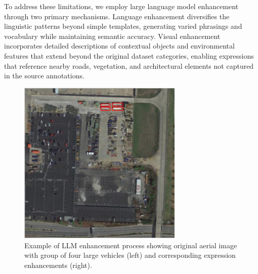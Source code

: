 To address these limitations, we employ large language model enhancement through two primary mechanisms. Language enhancement diversifies the linguistic patterns beyond simple templates, generating varied phrasings and vocabulary while maintaining semantic accuracy. Visual enhancement incorporates detailed descriptions of contextual objects and environmental features that extend beyond the original dataset categories, enabling expressions that reference nearby roads, vegetation, and architectural elements not captured in the source annotations.

\begin{figure}[t]
\centering
\begin{minipage}{0.5\textwidth}
\centering
\includegraphics[width=0.7\textwidth]{./images/example_group.png}
\end{minipage}%
\begin{minipage}{0.5\textwidth}
\centering
\hspace{-1cm}
\end{minipage}
\caption{Example of LLM enhancement process showing original aerial image with group of four large vehicles (left) and corresponding expression enhancements (right).}
\label{fig:llm_enhancement_example}
\end{figure}

